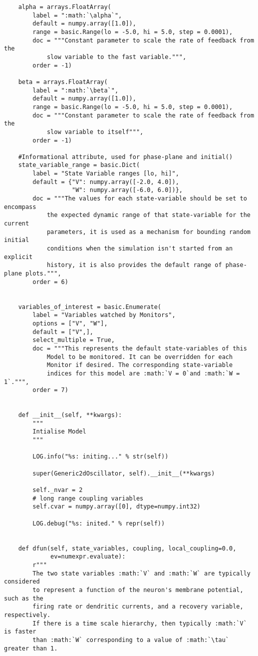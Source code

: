 \documentclass{article}
\begin{document}
\begin{lstlisting}
    alpha = arrays.FloatArray(
        label = ":math:`\alpha`",
        default = numpy.array([1.0]),
        range = basic.Range(lo = -5.0, hi = 5.0, step = 0.0001),
        doc = """Constant parameter to scale the rate of feedback from the 
            slow variable to the fast variable.""",
        order = -1)
        
    beta = arrays.FloatArray(
        label = ":math:`\beta`",
        default = numpy.array([1.0]),
        range = basic.Range(lo = -5.0, hi = 5.0, step = 0.0001),
        doc = """Constant parameter to scale the rate of feedback from the 
            slow variable to itself""",
        order = -1)

    #Informational attribute, used for phase-plane and initial()
    state_variable_range = basic.Dict(
        label = "State Variable ranges [lo, hi]",
        default = {"V": numpy.array([-2.0, 4.0]),
                   "W": numpy.array([-6.0, 6.0])},
        doc = """The values for each state-variable should be set to encompass
            the expected dynamic range of that state-variable for the current 
            parameters, it is used as a mechanism for bounding random initial 
            conditions when the simulation isn't started from an explicit
            history, it is also provides the default range of phase-plane plots.""",
        order = 6)

    
    variables_of_interest = basic.Enumerate(
        label = "Variables watched by Monitors",
        options = ["V", "W"],
        default = ["V",],
        select_multiple = True,
        doc = """This represents the default state-variables of this 
            Model to be monitored. It can be overridden for each 
            Monitor if desired. The corresponding state-variable 
            indices for this model are :math:`V = 0`and :math:`W = 1`.""",
        order = 7)
    

    def __init__(self, **kwargs):
        """
        Intialise Model
        """

        LOG.info("%s: initing..." % str(self))

        super(Generic2dOscillator, self).__init__(**kwargs)

        self._nvar = 2 
        # long range coupling variables
        self.cvar = numpy.array([0], dtype=numpy.int32)

        LOG.debug("%s: inited." % repr(self))


    def dfun(self, state_variables, coupling, local_coupling=0.0,
             ev=numexpr.evaluate):
        r"""
        The two state variables :math:`V` and :math:`W` are typically considered 
        to represent a function of the neuron's membrane potential, such as the 
        firing rate or dendritic currents, and a recovery variable, respectively. 
        If there is a time scale hierarchy, then typically :math:`V` is faster 
        than :math:`W` corresponding to a value of :math:`\tau` greater than 1.


\end{lstlisting}
\end{document}

